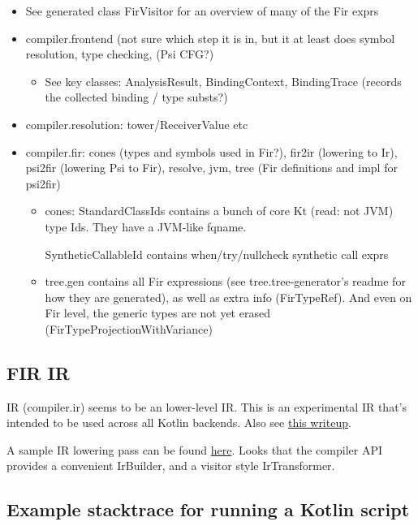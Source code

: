 \documentclass{article}
\begin{document}
\begin{itemize}
    \item See generated class FirVisitor for an overview of many of the Fir exprs
    \item compiler.frontend (not sure which step it is in, but it at least does symbol resolution, type checking, (Psi \textSafeTo CFG?)
    \begin{itemize}
        \item See key classes: AnalysisResult, BindingContext, BindingTrace (records the collected binding / type substs?)
    \end{itemize}
    \item compiler.resolution: tower/ReceiverValue etc
    \item compiler.fir: cones (types and symbols used in Fir?), fir2ir (lowering to Ir), psi2fir (lowering Psi to Fir), resolve, jvm, tree (Fir definitions and impl for psi2fir)
    \begin{itemize}
        \item cones: StandardClassIds contains a bunch of core Kt (read: not JVM) type Ids. They have a JVM-like fqname.

        SyntheticCallableId contains when/try/nullcheck synthetic call exprs

        \item tree.gen contains all Fir expressions (see tree.tree-generator's readme for how they are generated), as well as extra info (FirTypeRef). And even on Fir level, the generic types are not yet erased (FirTypeProjectionWithVariance)
    \end{itemize}
\end{itemize}

\subsection{FIR \textSafeTo IR}

IR (compiler.ir) seems to be an lower-level IR. This is an experimental IR that's intended to be used across all Kotlin backends. Also see \href{https://medium.com/@bnorm/exploring-kotlin-ir-bed8df167c23}{this writeup}.

A sample IR lowering pass can be found \href{https://github.com/JetBrains/kotlin/blob/936e53d/compiler/ir/backend.common/src/org/jetbrains/kotlin/backend/common/lower/TailrecLowering.kt}{here}. Looks that the compiler API provides a convenient IrBuilder, and a visitor style IrTransformer.

\subsection{Example stacktrace for running a Kotlin script}
\end{document}
